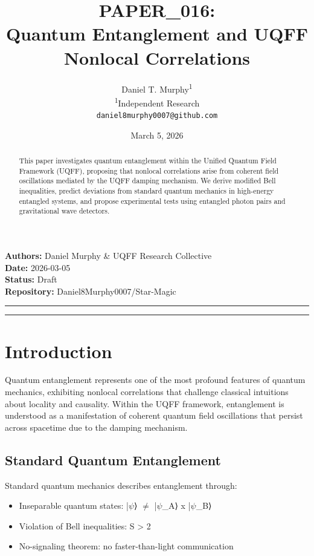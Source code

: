 \documentclass[12pt,a4paper]{article}
\title{\textbf{PAPER\_016: \\ Quantum Entanglement and UQFF Nonlocal Correlations}}
\author{
Daniel T. Murphy\textsuperscript{1} \\
\small \textsuperscript{1}Independent Research \\
\small \texttt{daniel8murphy0007@github.com}
}
\date{March 5, 2026}
\begin{document}
\maketitle

\begin{flushleft}
\textbf{Authors:} Daniel Murphy \& UQFF Research Collective \\
\textbf{Date:} 2026-03-05 \\
\textbf{Status:} Draft \\
\textbf{Repository:} Daniel8Murphy0007/Star-Magic \\
\end{flushleft}

\medskip\hrule\medskip

\begin{abstract}
This paper investigates quantum entanglement within the Unified Quantum Field Framework (UQFF), proposing that nonlocal correlations arise from coherent field oscillations mediated by the UQFF damping mechanism. We derive modified Bell inequalities, predict deviations from standard quantum mechanics in high-energy entangled systems, and propose experimental tests using entangled photon pairs and gravitational wave detectors.
\end{abstract}

\medskip\hrule\medskip

\section{Introduction}

Quantum entanglement represents one of the most profound features of quantum mechanics, exhibiting nonlocal correlations that challenge classical intuitions about locality and causality. Within the UQFF framework, entanglement is understood as a manifestation of coherent quantum field oscillations that persist across spacetime due to the damping mechanism.

\subsection{Standard Quantum Entanglement}

Standard quantum mechanics describes entanglement through:

\begin{itemize}
  \item Inseparable quantum states: |$\psi$⟩ $\neq$ |$\psi$\_A⟩ x |$\psi$\_B⟩
  \item Violation of Bell inequalities: S > 2
  \item No-signaling theorem: no faster-than-light communication
\end{itemize}
\end{document}
